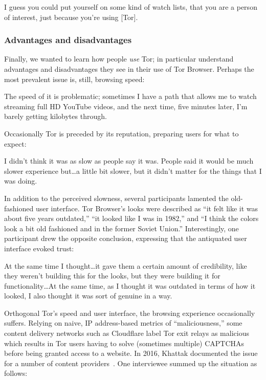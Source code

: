 \begin{displayquote}
I guess you could put yourself on some kind of watch lists, that you are a
person of interest, just because you're using [Tor].
\end{displayquote}

\subsubsection{Advantages and disadvantages}

Finally, we wanted to learn how people \emph{use} Tor; in particular understand
advantages and disadvantages they see in their use of Tor Browser.  Perhaps the
most prevalent issue is, still, browsing speed:

\begin{displayquote}
The speed of it is problematic; sometimes I have a path that allows me to watch
streaming full HD YouTube videos, and the next time, five minutes later, I'm
barely getting kilobytes through.
\end{displayquote}

Occasionally Tor is preceded by its reputation, preparing users for what to
expect:

\begin{displayquote}
I didn't think it was as slow as people say it was. People said it would be much
slower experience but\ldots a little bit slower, but it didn't matter for the
things that I was doing.
\end{displayquote}

In addition to the perceived slowness, several participants lamented the
old-fashioned user interface.  Tor Browser's looks were described as ``it felt
like it was about five years outdated,'' ``it looked like I was in 1982,'' and
``I think the colors look a bit old fashioned and in the former Soviet Union.''
Interestingly, one participant drew the opposite conclusion, expressing that the
antiquated user interface evoked trust:

\begin{displayquote}
At the same time I thought\ldots it gave them a certain amount of credibility,
like they weren't building this for the looks, but they were building it for
functionality\ldots  At the same time, as I thought it was outdated in terms of
how it looked, I also thought it was sort of genuine in a way.
\end{displayquote}

Orthogonal Tor's speed and user interface, the browsing experience occasionally
suffers.  Relying on naive, IP address-based metrics of ``maliciousness,'' some
content delivery networks such as Cloudflare label Tor exit relays as malicious
which results in Tor users having to solve (sometimes multiple) CAPTCHAs before
being granted access to a website.  In 2016, Khattak \ea documented the issue
for a number of content providers~\cite{Khattak2016a}.  One interviewee summed
up the situation as follows:

